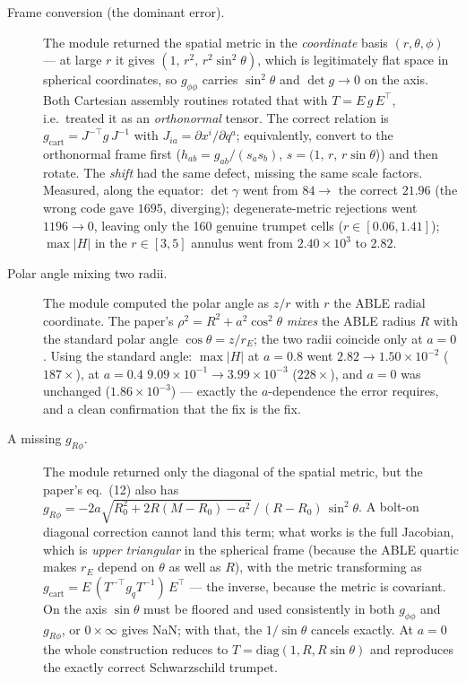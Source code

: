 \documentclass[11pt,openany]{book}
\begin{document}
\begin{description}
\item[Frame conversion (the dominant error).] The module returned the spatial
      metric in the \emph{coordinate} basis $(r,\theta,\phi)$ --- at large $r$
      it gives $(1,\, r^2,\, r^2\sin^2\theta)$, which is legitimately flat
      space in spherical coordinates, so $g_{\phi\phi}$ carries
      $\sin^2\theta$ and $\det g \to 0$ on the axis. Both Cartesian assembly
      routines rotated that with $T = E\,g\,E^\top$, i.e.\ treated it as an
      \emph{orthonormal} tensor. The correct relation is
      $g_{\mathrm{cart}} = J^{-\top} g\, J^{-1}$ with $J_{ia} = \partial
      x^i/\partial q^a$; equivalently, convert to the orthonormal frame first
      ($h_{ab} = g_{ab}/(s_a s_b)$, $s = (1,\, r,\, r\sin\theta$)) and then
      rotate. The \emph{shift} had the same defect, missing the same scale
      factors. Measured, along the equator: $\det\gamma$ went from $84 \to$
      the correct $21.96$ (the wrong code gave $1695$, diverging);
      degenerate-metric rejections went $1196 \to 0$, leaving only the 160
      genuine trumpet cells ($r \in [0.06, 1.41]$); $\max|H|$ in the
      $r \in [3,5]$ annulus went from $2.40\times10^{3}$ to $2.82$.
\item[Polar angle mixing two radii.] The module computed the polar angle as
      $z/r$ with $r$ the ABLE radial coordinate. The paper's
      $\rho^2 = R^2 + a^2\cos^2\theta$ \emph{mixes} the ABLE radius $R$ with
      the standard polar angle $\cos\theta = z/r_E$; the two radii coincide
      only at $a = 0$. Using the standard angle: $\max|H|$ at $a = 0.8$ went
      $2.82 \to 1.50\times10^{-2}$ ($187\times$), at $a = 0.4$
      $9.09\times10^{-1} \to 3.99\times10^{-3}$ ($228\times$), and $a = 0$
      was unchanged ($1.86\times10^{-3}$) --- exactly the $a$-dependence the
      error requires, and a clean confirmation that the fix is the fix.
\item[A missing $g_{R\phi}$.] The module returned only the diagonal of the
      spatial metric, but the paper's eq.\ (12) also has
      $g_{R\phi} = -2a\sqrt{R_0^2 + 2R(M-R_0) - a^2}\,/\,(R-R_0)\,
      \sin^2\theta$. A bolt-on diagonal correction cannot land this term;
      what works is the full Jacobian, which is \emph{upper triangular} in
      the spherical frame (because the ABLE quartic makes $r_E$ depend on
      $\theta$ as well as $R$), with the metric transforming as
      $g_{\mathrm{cart}} = E\,(T^{-\top} g_q T^{-1})\,E^\top$ --- the inverse,
      because the metric is covariant. On the axis $\sin\theta$ must be
      floored and used consistently in both $g_{\phi\phi}$ and
      $g_{R\phi}$, or $0 \times \infty$ gives NaN; with that, the
      $1/\sin\theta$ cancels exactly. At $a = 0$ the whole construction
      reduces to $T = \mathrm{diag}(1, R, R\sin\theta)$ and reproduces the
      exactly correct Schwarzschild trumpet.
\end{description}
\end{document}
